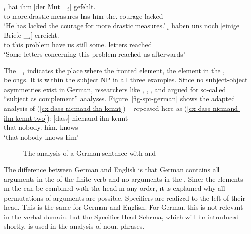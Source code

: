 \ex 
{}$_i$ hat ihm [der Mut \_$_i$] gefehlt.\\
     \spacebr{}to more.drastic measures has him \spacebr{}the.\NOM{} courage {} lacked\\
\glt `He has lacked the courage for more drastic measures.'
\ex 
{}$_i$ haben uns noch [einige Briefe \_$_i$] erreicht.\footnotemark\\
     \spacebr{}to this problem have us still \spacebr{}some.\NOM{} letters {} reached\\
\glt `Some letters concerning this problem reached us afterwards.'
\zl

\noindent
The \_$_i$ indicates the place where the fronted element, the element in the \vf, belongs. It is
within the subject NP in all three examples. Since no subject-object asymmetries exist in German,
researchers like \citet[]{Pollard90a}, \citet[Section~6.3.2]{Haider93a}, \citet[]{Eisenberg94b}, and \citet[, 78]{Kiss95a} argued for so-called ``subject as complement'' analyses. 
Figure~\vref{fig-spr-german} shows the adapted analysis of
(\ref{ex-dass-niemand-ihn-kennt}) -- repeated here as
(\ref{ex-dass-niemand-ihn-kennt-two}):
\ea
\label{ex-dass-niemand-ihn-kennt-two}
\gll  {}[dass] niemand ihn kennt\\
      \spacebr{}that nobody.\NOM{} him.\ACC{} knows\\ 
\glt `that nobody knows him'
\z
\begin{figure}
\caption{\label{fig-spr-german}The analysis of a German sentence with \spr and \compsl}
\end{figure}
The difference between German and English is that German contains all arguments in the \compsl of
the finite verb and no arguments in the \sprl. Since the elements in the \compsl can be combined
with the head in any order, it is explained why all permutations of arguments are
possible. Specifiers are realized to the left of their head. This is the same for German and
English. For German this is not relevant in the verbal domain, but the Specifier-Head Schema, which
will be introduced shortly, is used in the analysis of noun phrases.

